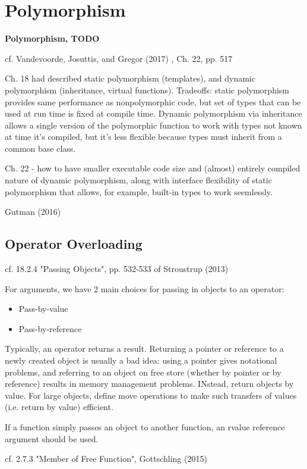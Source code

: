 \documentclass[10pt]{amsart}
\begin{document}
\section{Polymorphism}

\textbf{Polymorphism, TODO}

cf. Vandevoorde, Josuttis, and Gregor (2017) \cite{VJG2017}, Ch. 22, pp. 517


Ch. 18 had described static polymorphism (templates), and dynamic polymorphism (inheritance, virtual functions). Tradeoffs: static polymorphism provides same performance as nonpolymorphic code, but set of types that can be used at run time is fixed at compile time. Dynamic polymorphism via inheritance allows a single version of the polymorphic function to work with types not known at time it's compiled, but it's less flexible because types must inherit from a common base class.

Ch. 22 - how to have smaller executable code size and (almost) entirely compiled nature of dynamic polymorphism, along with interface flexibility of static polymorphism that allows, for example, built-in types to work seemlessly.

Gutman (2016) \cite{Gutt2016}

\subsection{Operator Overloading}

cf. 18.2.4 "Passing Objects", pp. 532-533 of Stroustrup (2013) \cite{Stro2013}

For arguments, we have 2 main choices for passing in objects to an operator: 
\begin{itemize}
\item Pass-by-value
\item Pass-by-reference
\end{itemize}

Typically, an operator returns a result. Returning a pointer or reference to a newly created object is usually a bad idea: using a pointer gives notational problems, and referring to an object on free store (whether by pointer or by reference) results in memory management problems. INstead, return objects by value. For large objects, define move operations to make such transfers of values (i.e. return by value) efficient.

If a function simply passes an object to another function, an rvalue reference argument  should be used.

cf. 2.7.3 "Member of Free Function",  Gottschling (2015) \cite{Gott2015}
\end{document}
